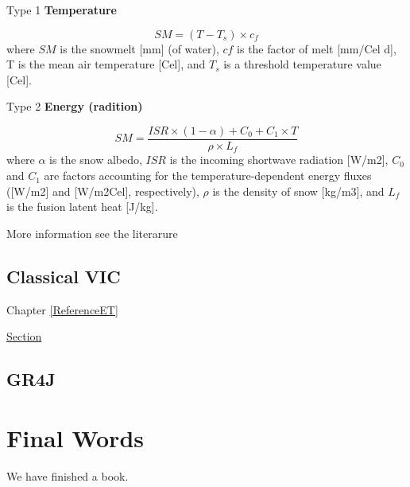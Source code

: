 \documentclass[
]{book}
\begin{document}
Type 1 \textbf{Temperature}

\[SM=(T-T_s)\times c_f\]
where \(SM\) is the snowmelt {[}mm{]} (of water), \(cf\) is the factor of melt {[}mm/Cel d{]}, T is the mean air temperature {[}Cel{]}, and \(T_s\) is a threshold temperature value {[}Cel{]}.

Type 2 \textbf{Energy (radition)}

\[SM=\frac{ISR\times(1-\alpha)+C_0+C_1\times T}{\rho \times L_f}\]
where \(\alpha\) is the snow albedo, \(ISR\) is the incoming shortwave radiation {[}W/m2{]}, \(C_0\) and \(C_1\) are factors accounting for the temperature-dependent energy fluxes ({[}W/m2{]} and {[}W/m2Cel{]}, respectively), \(\rho\) is the density of snow {[}kg/m3{]}, and \(L_f\) is the fusion latent heat {[}J/kg{]}.

More information see the literarure \citep{Troin.2018}

\hypertarget{classical-vic}{%
\section{Classical VIC}\label{classical-vic}}

Chapter \ref{ReferenceET}

\protect\hyperlink{ReferenceET}{Section}

\hypertarget{gr4j}{%
\section{GR4J}\label{gr4j}}

\hypertarget{final-words}{%
\chapter{Final Words}\label{final-words}}

We have finished a book.

  
\end{document}
